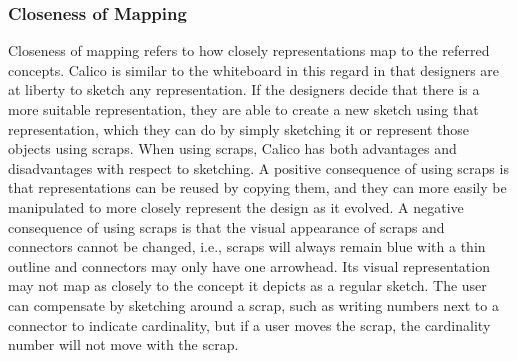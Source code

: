 \subsubsection{Closeness of Mapping}
Closeness of mapping refers to how closely representations map to the referred concepts. Calico is similar to the whiteboard in this regard in that designers are at liberty to sketch any representation. If the designers decide that there is a more suitable representation, they are able to create a new sketch using that representation, which they can do by simply sketching it or represent those objects using scraps. When using scraps, Calico has both advantages and disadvantages with respect to sketching. A positive consequence of using scraps is that representations can be reused by copying them, and they can more easily be manipulated to more closely represent the design as it evolved. A negative consequence of using scraps is that the visual appearance of scraps and connectors cannot be changed, i.e., scraps will always remain blue with a thin outline and connectors may only have one arrowhead. Its visual representation may not map as closely to the concept it depicts as a regular sketch. The user can compensate by sketching around a scrap, such as writing numbers next to a connector to indicate cardinality, but if a user moves the scrap, the cardinality number will not move with the scrap.


%

